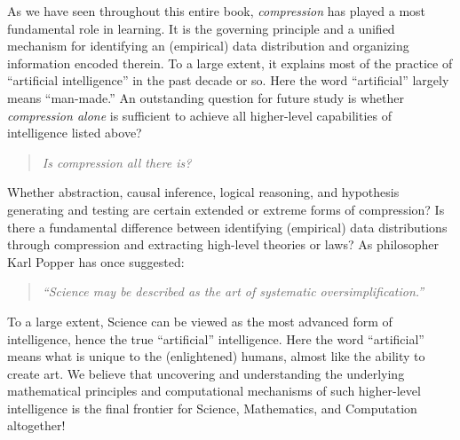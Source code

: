 \documentclass[../../book-main.tex]{subfiles}
\begin{document}
As we have seen throughout this entire book, {\em compression} has played a most fundamental role in learning. It is the governing principle and a unified mechanism for identifying an (empirical) data distribution and organizing information encoded therein. To a large extent, it explains most of the practice of ``artificial intelligence'' in the past decade or so. Here the word ``artificial'' largely means ``man-made.'' An outstanding question for future study is whether {\em compression alone} is sufficient to achieve all higher-level capabilities of intelligence listed above? 
\begin{quote}
\begin{center}
        {\em Is compression all there is?}
\end{center}
\end{quote}
Whether abstraction, causal inference, logical reasoning, and hypothesis generating and testing are certain extended or extreme forms of compression? Is there a fundamental difference between identifying (empirical) data distributions through compression and extracting high-level theories or laws?  As philosopher Karl Popper has once suggested:
\begin{quote}
    \begin{center}
    {\em ``Science may be described as the art of systematic oversimplification.''}
    \end{center}
\end{quote}
To a large extent, Science can be viewed as the most advanced form of intelligence, hence the true ``artificial'' intelligence. Here the word ``artificial'' means what is unique to the (enlightened) humans, almost like the ability to create art. 
We believe that uncovering and understanding the underlying mathematical principles and computational mechanisms of such higher-level intelligence is the final frontier for Science, Mathematics, and Computation altogether!
\end{document}
